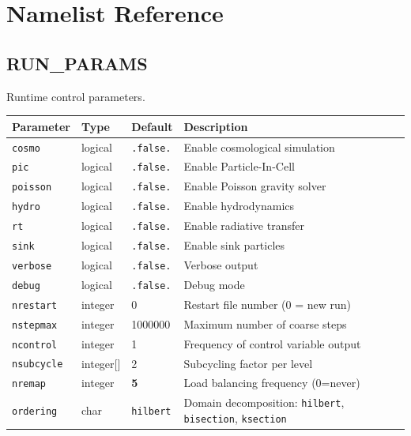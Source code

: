 \documentclass[11pt,fleqn]{book}
\begin{document}
\part{Namelist Reference}

\chapter{RUN\_PARAMS}

Runtime control parameters.

\begin{longtable}{L{3.5cm} C{1.8cm} C{1.8cm} L{6cm}}
\toprule
\textbf{Parameter} & \textbf{Type} & \textbf{Default} & \textbf{Description} \\
\midrule
\endhead
\texttt{cosmo} & logical & \texttt{.false.} & Enable cosmological simulation \\
\texttt{pic} & logical & \texttt{.false.} & Enable Particle-In-Cell \\
\texttt{poisson} & logical & \texttt{.false.} & Enable Poisson gravity solver \\
\texttt{hydro} & logical & \texttt{.false.} & Enable hydrodynamics \\
\texttt{rt} & logical & \texttt{.false.} & Enable radiative transfer \\
\texttt{sink} & logical & \texttt{.false.} & Enable sink particles \\
\texttt{verbose} & logical & \texttt{.false.} & Verbose output \\
\texttt{debug} & logical & \texttt{.false.} & Debug mode \\
\midrule
\texttt{nrestart} & integer & 0 & Restart file number (0 = new run) \\
\texttt{nstepmax} & integer & 1000000 & Maximum number of coarse steps \\
\texttt{ncontrol} & integer & 1 & Frequency of control variable output \\
\texttt{nsubcycle} & integer[] & 2 & Subcycling factor per level \\
\texttt{nremap} & integer & \textbf{5} & Load balancing frequency (0=never) \\
\texttt{ordering} & char & \texttt{hilbert} & Domain decomposition: \texttt{hilbert}, \texttt{bisection}, \texttt{ksection} \\

\end{longtable}
\end{document}
